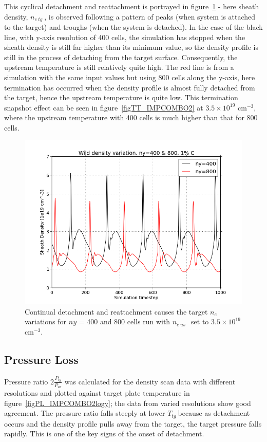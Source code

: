 \documentclass[12pt]{article}  %
\providecommand{\noNe}[1]{{${#1}\times 10^{19}$ cm$^{-3}$}} %
\providecommand{\neus}{$n_{e~us}~$} %
\providecommand{\netg}{$n_{e~tg}~$} %
\providecommand{\Ttg}{$T_{tg}~$} %
\begin{document}
This cyclical detachment and reattachment is portrayed in figure~\ref{figny400800r35netg} - here sheath density, \netg, is observed following a pattern of peaks (when system is attached to the target) and troughs (when the system is detached). In the case of the black line, with y-axis resolution of 400 cells, the simulation has stopped when the sheath density is still far higher than its minimum value, so the density profile is still in the process of detaching from the target surface. Consequently, the upstream temperature is still relatively quite high. The red line is from a simulation with the same input values but using 800 cells along the y-axis, here termination has occurred when the density profile is almost fully detached from the target, hence the upstream temperature is quite low. This termination snapshot effect can be seen in figure~\ref{figTT_IMPCOMBO2} at \noNe{3.5}, where the upstream temperature with 400 cells is much higher than that for 800 cells.

\begin{figure}
\includegraphics[scale=0.5]{Figures/sol1d/ny400800r35netg.png}
\centering
\caption{Continual detachment and reattachment causes the target $n_e$ variations for $ny$ = 400 and 800 cells run with \neus~set to \noNe{3.5}.}\label{figny400800r35netg}
\end{figure}

\subsection{Pressure Loss}\label{ssecPloss}
Pressure ratio $2\frac{P_{tg}}{P_{us}}$ was calculated for the density scan data with different resolutions and plotted against target plate temperature in figure~\ref{figPL_IMPCOMBO2logy}; the data from varied resolutions show good agreement. The pressure ratio falls steeply at lower \Ttg because as detachment occurs and the density profile pulls away from the target, the target pressure falls rapidly. This is one of the key signs of the onset of detachment.
\end{document}
